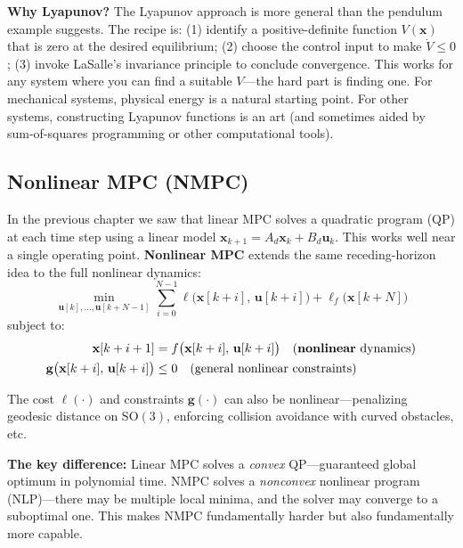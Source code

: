 \textbf{Why Lyapunov?} The Lyapunov approach is more general than the pendulum example suggests. The recipe is: (1) identify a positive-definite function $V(\mathbf{x})$ that is zero at the desired equilibrium; (2) choose the control input to make $\dot{V} \leq 0$; (3) invoke LaSalle's invariance principle to conclude convergence. This works for any system where you can find a suitable $V$---the hard part is finding one. For mechanical systems, physical energy is a natural starting point. For other systems, constructing Lyapunov functions is an art (and sometimes aided by sum-of-squares programming or other computational tools).

\subsection{Nonlinear MPC (NMPC)}

In the previous chapter we saw that linear MPC solves a quadratic program (QP) at each time step using a linear model $\mathbf{x}_{k+1} = A_d \mathbf{x}_k + B_d \mathbf{u}_k$. This works well near a single operating point. \textbf{Nonlinear MPC} extends the same receding-horizon idea to the full nonlinear dynamics:
\begin{equation}
\min_{\mathbf{u}[k], \ldots, \mathbf{u}[k+N-1]} \sum_{i=0}^{N-1} \ell\bigl(\mathbf{x}[k+i],\, \mathbf{u}[k+i]\bigr) + \ell_f\bigl(\mathbf{x}[k+N]\bigr)
\end{equation}
subject to:
\begin{align}
\mathbf{x}[k+i+1] &= f\bigl(\mathbf{x}[k+i],\, \mathbf{u}[k+i]\bigr) \quad \text{(\textbf{nonlinear} dynamics)} \\
\mathbf{g}\bigl(\mathbf{x}[k+i],\, \mathbf{u}[k+i]\bigr) &\leq 0 \quad \text{(general nonlinear constraints)}
\end{align}

The cost $\ell(\cdot)$ and constraints $\mathbf{g}(\cdot)$ can also be nonlinear---penalizing geodesic distance on $\mathrm{SO}(3)$, enforcing collision avoidance with curved obstacles, etc.

\textbf{The key difference:} Linear MPC solves a \textit{convex} QP---guaranteed global optimum in polynomial time. NMPC solves a \textit{nonconvex} nonlinear program (NLP)---there may be multiple local minima, and the solver may converge to a suboptimal one. This makes NMPC fundamentally harder but also fundamentally more capable.

